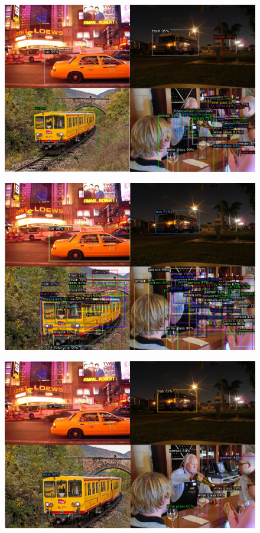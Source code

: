 \documentclass{article}
\begin{document}
\begin{figure}[h!]
  \begin{minipage}{0.47\textwidth}
  \includegraphics[width=\textwidth, height=0.17\textheight]{./../../figures/1shot.png}
  \label{1 Shot}
  \end{minipage}
  \begin{minipage}{0.47\textwidth}
  \includegraphics[width=\textwidth, height=0.17\textheight]{./../../figures/5shot.png}
  \label{5 Shot}
  \end{minipage}
  \begin{minipage}{0.47\textwidth}
  \includegraphics[width=\textwidth, height=0.17\textheight]{./../../figures/10shot.png}

\end{minipage}
\end{figure}
\end{document}
